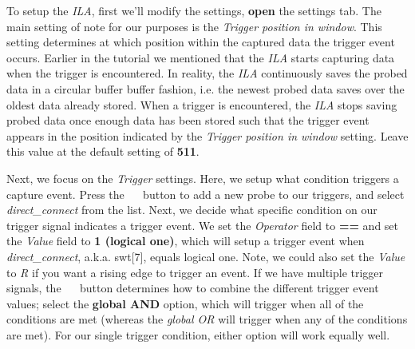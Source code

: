 \documentclass[11pt]{article}
\begin{document}
To setup the \textit{ILA}, first we'll modify the settings, \textbf{open} the settings tab. The main setting of note for our purposes is the \textit{Trigger position in window}. This setting determines at which position within the captured data the trigger event occurs. Earlier in the tutorial we mentioned that the \textit{ILA} starts capturing data when the trigger is encountered. In reality, the \textit{ILA} continuously saves the probed data in a circular buffer buffer fashion, i.e. the newest probed data saves over the oldest data already stored. When a trigger is encountered, the \textit{ILA} stops saving probed data once enough data has been stored such that the trigger event appears in the position indicated by the \textit{Trigger position in window} setting. Leave this value at the default setting of \textbf{511}.

Next, we focus on the \textit{Trigger} settings. Here, we setup what condition triggers a capture event. Press the 
~~
button to add a new probe to our triggers, and select \textit{direct\_connect} from the list. Next, we decide what specific condition on our trigger signal indicates a trigger event. We set the \textit{Operator} field to \textbf{==} and set the \textit{Value} field to \textbf{1 (logical one)}, which will setup a trigger event when \textit{direct\_connect}, a.k.a. swt[7], equals logical one. Note, we could also set the \textit{Value} to \textit{R} if you want a rising edge to trigger an event. If we have multiple trigger signals, the
~~
button determines how to combine the different trigger event values; select the \textbf{global AND} option, which will trigger when all of the conditions are met (whereas the \textit{global OR} will trigger when any of the conditions are met). For our single trigger condition, either option will work equally well.
\end{document}

